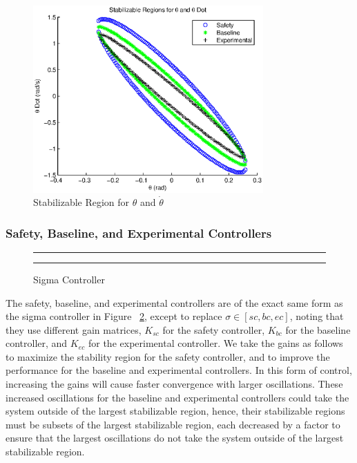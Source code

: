 \documentclass[conference]{IEEEtran}
\begin{document}
\begin{figure}[htp]
\centering
\includegraphics[width=250pt]{stabRegionTheta}
\caption{Stabilizable Region for $\theta$ and $\dot{\theta}$}\label{fig:stabRegionTheta}
\end{figure}


\subsubsection{Safety, Baseline, and Experimental Controllers}

\begin{figure}[h!]
\centering
  \hrule
  {}
  \hrule
  \caption{Sigma Controller}
  \label{fig:safetyController}
\end{figure}

The safety, baseline, and experimental controllers are of the exact same form as the sigma controller in Figure ~\ref{fig:safetyController}, except to replace $\sigma\in\left[sc,bc,ec\right]$, noting that they use different gain matrices, $K_{sc}$ for the safety controller, $K_{bc}$ for the baseline controller, and $K_{ec}$ for the experimental controller.  We take the gains as follows to maximize the stability region for the safety controller, and to improve the performance for the baseline and experimental controllers.  In this form of control, increasing the gains will cause faster convergence with larger oscillations.  These increased oscillations for the baseline and experimental controllers could take the system outside of the largest stabilizable region, hence, their stabilizable regions must be subsets of the largest stabilizable region, each decreased by a factor to ensure that the largest oscillations do not take the system outside of the largest stabilizable region.
\end{document}
